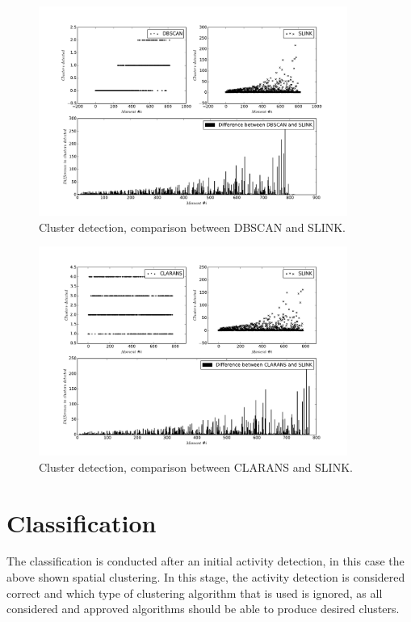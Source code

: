 \begin{figure}[ht]
    \centering
    \includegraphics[width=0.9\textwidth]{plots/dbscan_vs_slink.pdf}
    \caption{Cluster detection, comparison between DBSCAN and SLINK.
    \label{fig:dbscan-vs-slink} }
\end{figure}

\begin{figure}[ht]
    \centering
    \includegraphics[width=0.9\textwidth]{plots/clarans_vs_slink.pdf}
    \caption{Cluster detection, comparison between CLARANS and SLINK.
    \label{fig:clarans-vs-slink} }
\end{figure}

\cleartoleftpage

\section{Classification}
The classification is conducted after an initial activity detection, in 
this case the above shown spatial clustering. In this stage, the activity
detection is considered correct and which type of clustering algorithm 
that is used is ignored, as all considered and approved algorithms should 
be able to produce desired clusters.

